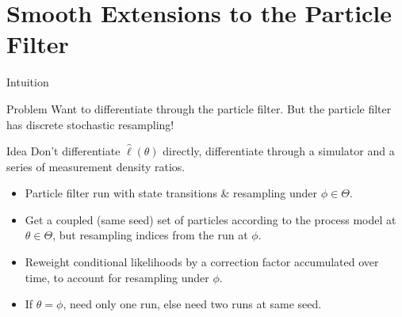 \documentclass{beamer}
\begin{document}
\section{Smooth Extensions to the Particle Filter}

\begin{frame}{Intuition}
    \begin{block}{Problem}
        Want to differentiate through the particle filter. But the particle filter has discrete stochastic resampling! 
    \end{block}
    \pause 
    \begin{block}{Idea}
        Don't differentiate $\hat\ell(\theta)$ directly, differentiate through a simulator and a series of measurement density ratios.
    \end{block}
    \begin{itemize}
        \item \pause Particle filter run with state transitions \& resampling under $\phi \in \Theta$. 
        \item \pause Get a coupled (same seed) set of particles according to the process model at $\theta \in \Theta$, but resampling indices from the run at $\phi$. 
        \item \pause Reweight conditional likelihoods by a correction factor accumulated over time, to account for resampling under $\phi$. 
        \item \pause If $\theta=\phi$, need only one run, else need two runs at same seed. 
    \end{itemize}
\end{frame}
\end{document}
